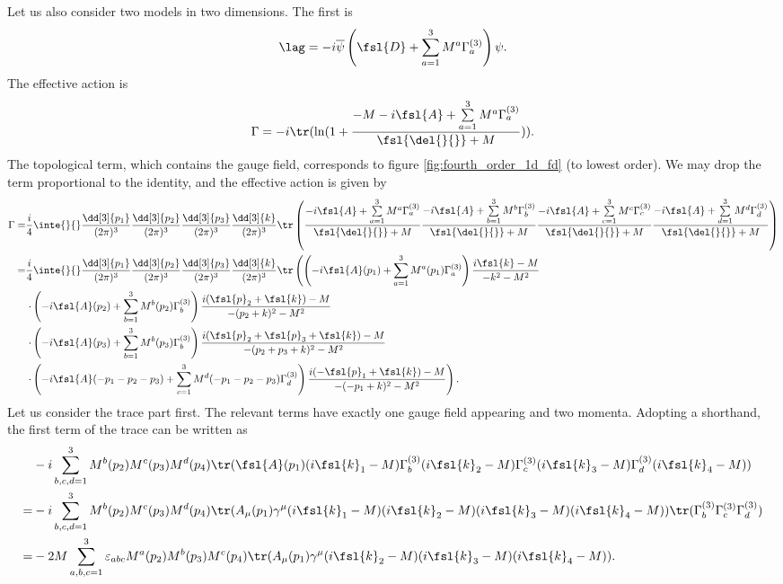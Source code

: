 Let us also consider two models in two dimensions. The first is
\begin{align*}
	\lag = -i\overline{\psi}\left(\fsl{D} + \sum\limits_{a = 1}^{3}M^{a}\Gamma_{a}^{(3)}\right)\psi.
\end{align*}
The effective action is
\begin{align*}
	\Gamma = -i\tr(\ln(1 + \frac{-M - i\fsl{A} + \sum\limits_{a = 1}^{3}M^{a}\Gamma_{a}^{(3)}}{\fsl{\del{}{}} + M})).
\end{align*}
The topological term, which contains the gauge field, corresponds to figure \ref{fig:fourth_order_1d_fd} (to lowest order). We may drop the term proportional to the identity, and the effective action is given by
\begin{align*}
	\Gamma =& \frac{i}{4}\inte{}{}\frac{\dd[3]{p_{1}}}{(2\pi)^{3}}\frac{\dd[3]{p_{2}}}{(2\pi)^{3}}\frac{\dd[3]{p_{3}}}{(2\pi)^{3}}\frac{\dd[3]{k}}{(2\pi)^{3}}\tr\left(\frac{-i\fsl{A} + \sum\limits_{a = 1}^{3}M^{a}\Gamma_{a}^{(3)}}{\fsl{\del{}{}} + M}\frac{-i\fsl{A} + \sum\limits_{b = 1}^{3}M^{b}\Gamma_{b}^{(3)}}{\fsl{\del{}{}} + M}\frac{-i\fsl{A} + \sum\limits_{c = 1}^{3}M^{c}\Gamma_{c}^{(3)}}{\fsl{\del{}{}} + M}\frac{-i\fsl{A} + \sum\limits_{d = 1}^{3}M^{d}\Gamma_{d}^{(3)}}{\fsl{\del{}{}} + M}\right) \\
	=& \frac{i}{4}\inte{}{}\frac{\dd[3]{p_{1}}}{(2\pi)^{3}}\frac{\dd[3]{p_{2}}}{(2\pi)^{3}}\frac{\dd[3]{p_{3}}}{(2\pi)^{3}}\frac{\dd[3]{k}}{(2\pi)^{3}}\tr\left(\left(-i\fsl{A}(p_{1}) + \sum\limits_{a = 1}^{3}M^{a}(p_{1})\Gamma_{a}^{(3)}\right)\frac{i\fsl{k} - M}{-k^{2} - M^{2}}\right. \\
	 &\left.\cdot\left(-i\fsl{A}(p_{2}) + \sum\limits_{b = 1}^{3}M^{b}(p_{2})\Gamma_{b}^{(3)}\right)\frac{i(\fsl{p}_{2} + \fsl{k}) - M}{-(p_{2} + k)^{2} - M^{2}}\right. \\
	 &\left.\cdot\left(-i\fsl{A}(p_{3}) + \sum\limits_{b = 1}^{3}M^{b}(p_{3})\Gamma_{b}^{(3)}\right)\frac{i(\fsl{p}_{2} + \fsl{p}_{3} + \fsl{k}) - M}{-(p_{2} + p_{3} + k)^{2} - M^{2}}\right. \\
	 &\left.\cdot\left(-i\fsl{A}(-p_{1} - p_{2} - p_{3}) + \sum\limits_{c = 1}^{3}M^{d}(-p_{1} - p_{2} - p_{3})\Gamma_{d}^{(3)}\right)\frac{i(-\fsl{p}_{1} + \fsl{k}) - M}{-(-p_{1} + k)^{2} - M^{2}}\right).
\end{align*}
Let us consider the trace part first. The relevant terms have exactly one gauge field appearing and two momenta. Adopting a shorthand, the first term of the trace can be written as
\begin{align*}
	 &-i\sum\limits_{b, c, d = 1}^{3}M^{b}(p_{2})M^{c}(p_{3})M^{d}(p_{4})\tr(\fsl{A}(p_{1})(i\fsl{k}_{1} - M)\Gamma_{b}^{(3)}(i\fsl{k}_{2} - M)\Gamma_{c}^{(3)}(i\fsl{k}_{3} - M)\Gamma_{d}^{(3)}(i\fsl{k}_{4} - M)) \\
	=& -i\sum\limits_{b, c, d = 1}^{3}M^{b}(p_{2})M^{c}(p_{3})M^{d}(p_{4})\tr(A_{\mu}(p_{1})\gamma^{\mu}(i\fsl{k}_{1} - M)(i\fsl{k}_{2} - M)(i\fsl{k}_{3} - M)(i\fsl{k}_{4} - M))\tr(\Gamma_{b}^{(3)}\Gamma_{c}^{(3)}\Gamma_{d}^{(3)}) \\
	=& -2M\sum\limits_{a, b, c = 1}^{3}\varepsilon_{abc}M^{a}(p_{2})M^{b}(p_{3})M^{c}(p_{4})\tr(A_{\mu}(p_{1})\gamma^{\mu}(i\fsl{k}_{2} - M)(i\fsl{k}_{3} - M)(i\fsl{k}_{4} - M)).
\end{align*}
